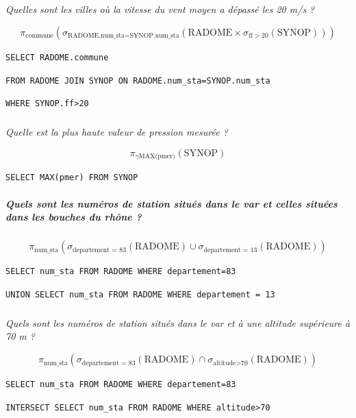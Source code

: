 \documentclass[10pt,fleqn]{article} %
\begin{document}
\subparagraph{}
\textit{Quelles sont les villes où la vitesse du vent moyen a dépassé les 20 m/s ? }
\ifprof
\begin{corrige}
$$ \pi_{\text{commune}}\left(\sigma_{\text{RADOME.num\_sta=SYNOP.num\_sta}} \left(\text{RADOME} \times \sigma_{\text{ff}>20}\left(\text{SYNOP} \right) \right)\right) $$

\hspace{1cm} \texttt{SELECT RADOME.commune}

\hspace{2cm} \texttt{FROM RADOME JOIN SYNOP ON RADOME.num\_sta=SYNOP.num\_sta}

\hspace{2cm} \texttt{WHERE SYNOP.ff>20}

\end{corrige}
\else
\fi
\subparagraph{}
\textit{Quelle est la plus haute valeur de pression mesurée ?}
\ifprof
\begin{corrige}
$$ \pi_{\gamma \text{MAX(pmer)}}\left(\text{SYNOP}\right) $$

\begin{center}
\texttt{SELECT MAX(pmer) FROM SYNOP}
\end{center}

\end{corrige}
\else
\fi
\subparagraph{Quels sont les numéros de station situés dans le var et celles situées dans les bouches du rhône ? }
\textit{}
\ifprof
\begin{corrige}
$$ \pi_{\text{num\_sta}}\left(\sigma_{\text{departement = 83}} \left(\text{RADOME}\right) \cup \sigma_{\text{departement = 13}} \left(\text{RADOME}\right) \right) $$

\hspace{1cm} \texttt{SELECT num\_sta FROM RADOME WHERE departement=83}

\hspace{2cm} \texttt{UNION SELECT num\_sta FROM RADOME WHERE departement = 13}

\end{corrige}
\else
\fi
\subparagraph{}
\textit{Quels sont les numéros de station situés dans le var et à une altitude supérieure à 70 m ? }
\ifprof
\begin{corrige}
$$ \pi_{\text{num\_sta}}\left(\sigma_{\text{departement = 83}} \left(\text{RADOME}\right) \cap \sigma_{\text{altitude>70}} \left(\text{RADOME}\right) \right) $$

\hspace{1cm} \texttt{SELECT num\_sta FROM RADOME WHERE departement=83}

\hspace{2cm} \texttt{INTERSECT SELECT num\_sta FROM RADOME WHERE altitude>70}
\end{corrige}
\end{document}
